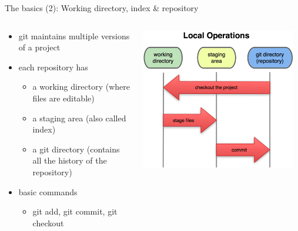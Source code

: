 \begin{frame}{The basics (2): Working directory, index \& repository}
  \begin{columns}[onlytextwidth]
    \begin{column}{0.6\textwidth}
      \begin{itemize}
        \item git maintains multiple versions of a project
        \item each repository has
        \begin{itemize}
          \item a working directory (where files are editable)
          \item a staging area (also called index)
          \item a git directory (contains all the history of the repository)
        \end{itemize}
        \item basic commands
        \begin{itemize}
          \item git add, git commit, git checkout
        \end{itemize}
      \end{itemize}
    \end{column}
    \begin{column}[c]{0.4\textwidth}
      \includegraphics[width=0.95\textwidth]{imgs/git_local}
    \end{column}
  \end{columns}
\end{frame}